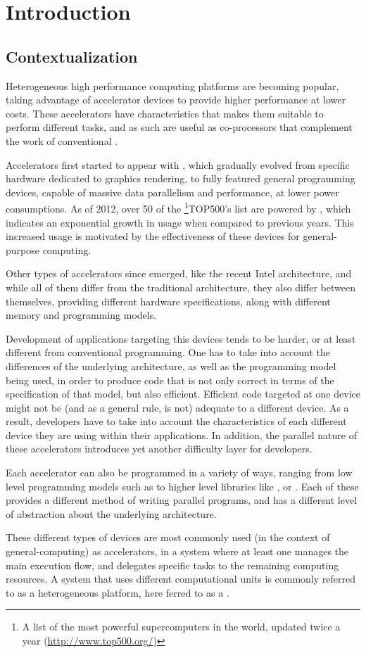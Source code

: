 \documentclass[main.tex]{subfiles}
\begin{document}
\newpage
\section{Introduction}

\subsection{Contextualization}

Heterogeneous high performance computing platforms are becoming popular, taking advantage of accelerator devices to provide higher performance at lower costs. These accelerators have characteristics that makes them suitable to perform different tasks, and as such are useful as co-processors that complement the work of conventional \cpus.

Accelerators first started to appear with \gpus, which gradually evolved from specific hardware dedicated to graphics rendering, to fully featured general programming devices, capable of massive data parallelism and performance, at lower power consumptions. As of 2012, over 50 of the \footnote{A list of the most powerful supercomputers in the world, updated twice a year (\url{http://www.top500.org/})}{TOP500's} list are powered by \gpus, which indicates an exponential growth in usage when compared to previous years. This increased usage is motivated by the effectiveness of these devices for general-purpose computing.

Other types of accelerators since emerged, like the recent Intel \mic architecture, and while all of them differ from the traditional \cpu architecture, they also differ between themselves, providing different hardware specifications, along with different memory and programming models.

Development of applications targeting this devices tends to be harder, or at least different from conventional programming. One has to take into account the differences of the underlying architecture, as well as the programming model being used, in order to produce code that is not only correct in terms of the specification of that model, but also efficient. Efficient code targeted at one device might not be (and as a general rule, is not) adequate to a different device. As a result, developers have to take into account the characteristics of each different device they are using within their applications. In addition, the parallel nature of these accelerators introduces yet another difficulty layer for developers.

Each accelerator can also be programmed in a variety of ways, ranging from low level programming models such as \cuda to higher level libraries like \openmp, or \openacc. Each of these provides a different method of writing parallel programs, and has a different level of abstraction about the underlying architecture.

These different types of devices are most commonly used (in the context of general-computing) as accelerators, in a system where at least one \cpu manages the main execution flow, and delegates specific tasks to the remaining computing resources. A system that uses different computational units is commonly referred to as a heterogeneous platform, here ferred to as a \hetplat.
\end{document}
